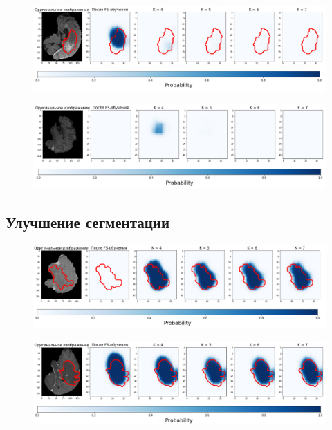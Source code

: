 \begin{figure}[h!] 
  \center
  \includegraphics [scale=0.7] {images/bad_2.png}
\end{figure}


\begin{figure}[h!] 
  \center
  \includegraphics [scale=0.7] {images/bad_3.png}
\end{figure}


\subsection{Улучшение сегментации}

\begin{figure}[h!] 
  \center
  \includegraphics [scale=0.7] {images/good_1.png}
\end{figure}


\begin{figure}[h!] 
  \center
  \includegraphics [scale=0.7] {images/good_2.png}
\end{figure}


